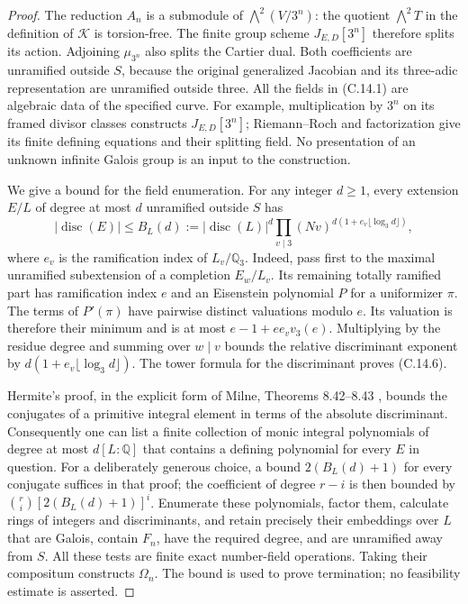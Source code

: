 \begin{proof}
The reduction $A_n$ is a submodule of
$\bigwedge^2(V/3^n)$: the quotient $\bigwedge^2T$ in the
definition of $\mathcal K$ is torsion-free. The finite group
scheme $J_{E,D}[3^n]$ therefore splits its action. Adjoining
$\mu_{3^n}$ also splits the Cartier dual. Both coefficients
are unramified outside $S$, because the original generalized
Jacobian and its three-adic representation are unramified
outside three. All the fields in (C.14.1) are algebraic data
of the specified curve. For example, multiplication by $3^n$
on its framed divisor classes constructs $J_{E,D}[3^n]$;
Riemann--Roch and factorization give its finite defining
equations and their splitting field. No presentation of an
unknown infinite Galois group is an input to the construction.

We give a bound for the field enumeration. For any integer
$d\ge1$, every extension $E/L$ of degree at most $d$
unramified outside $S$ has
\[
 |\operatorname{disc}(E)|\le
 B_L(d):=|\operatorname{disc}(L)|^d
       \prod_{v\mid3}(Nv)^{d(1+e_v\lfloor\log_3 d\rfloor)},
                                                               \tag{C.14.6}
\]
where $e_v$ is the ramification index of $L_v/\mathbb Q_3$.
Indeed, pass first to the maximal unramified subextension
of a completion $E_w/L_v$. Its remaining totally ramified
part has ramification index $e$ and an Eisenstein polynomial
$P$ for a uniformizer $\pi$. The terms of $P'(\pi)$ have
pairwise distinct valuations modulo $e$. Its valuation is
therefore their minimum and is at most
$e-1+e e_v v_3(e)$. Multiplying by the residue degree and
summing over $w\mid v$ bounds the relative discriminant
exponent by $d(1+e_v\lfloor\log_3d\rfloor)$. The tower
formula for the discriminant proves (C.14.6).

Hermite's proof, in the explicit form of Milne,
Theorems 8.42--8.43 \cite{CMilneANT}, bounds the conjugates
of a primitive integral element in terms of the absolute
discriminant. Consequently one can list a finite collection
of monic integral polynomials of degree at most $d[L:\mathbb Q]$
that contains a defining polynomial for every $E$ in question.
For a deliberately generous choice, a bound
$2(B_L(d)+1)$ for every conjugate suffices in that proof;
the coefficient of degree $r-i$ is then bounded by
$\binom ri[2(B_L(d)+1)]^i$. Enumerate these polynomials,
factor them, calculate rings of integers and discriminants,
and retain precisely their embeddings over $L$ that are
Galois, contain $F_n$, have the required degree, and are
unramified away from $S$. All these tests are finite exact
number-field operations. Taking their compositum constructs
$\Omega_n$. The bound is used to prove termination; no
feasibility estimate is asserted.


\end{proof}
